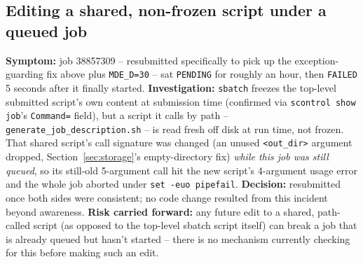 \documentclass[11pt]{article}
\begin{document}
\subsection{Editing a shared, non-frozen script under a queued job}
\label{sec:history-shared-script}
\textbf{Symptom:} job 38857309 -- resubmitted specifically to pick up the exception-guarding fix above plus \texttt{MDE\_D=30} -- sat \texttt{PENDING} for roughly an hour, then \texttt{FAILED} 5 seconds after it finally started. \textbf{Investigation:} \texttt{sbatch} freezes the top-level submitted script's own content at submission time (confirmed via \texttt{scontrol show job}'s \texttt{Command=} field), but a script it calls by path -- \texttt{generate\_job\_description.sh} -- is read fresh off disk at run time, not frozen. That shared script's call signature was changed (an unused \texttt{<out\_dir>} argument dropped, Section~\ref{sec:storage}'s empty-directory fix) \emph{while this job was still queued}, so its still-old 5-argument call hit the new script's 4-argument usage error and the whole job aborted under \texttt{set -euo pipefail}. \textbf{Decision:} resubmitted once both sides were consistent; no code change resulted from this incident beyond awareness. \textbf{Risk carried forward:} any future edit to a shared, path-called script (as opposed to the top-level sbatch script itself) can break a job that is already queued but hasn't started -- there is no mechanism currently checking for this before making such an edit.
\end{document}
